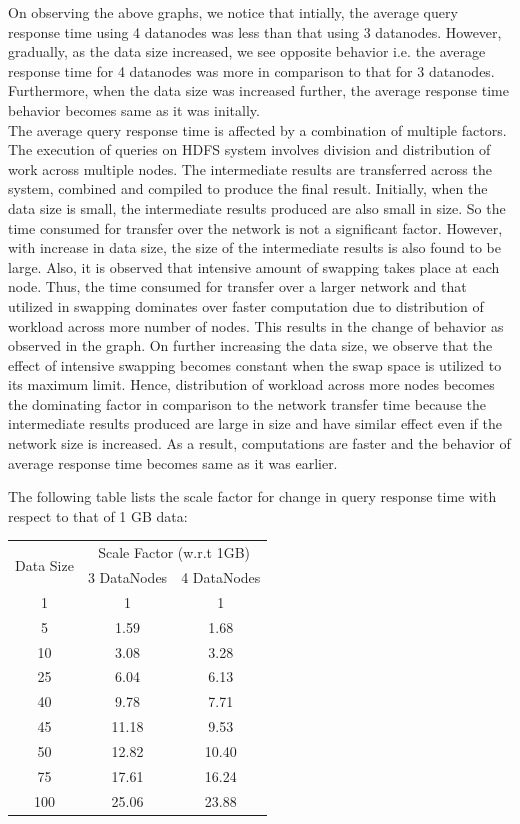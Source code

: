 \documentclass[12pt]{book}
\begin{document}
On observing the above graphs, we notice that intially, the average query response time using 4 datanodes was less than that using 3 datanodes.
However, gradually, as the data size increased, we see opposite behavior i.e. the average response time for 4 datanodes was more in comparison
to that for 3 datanodes. Furthermore, when the data size was increased further, the average response time behavior becomes same as it was 
initally.
\\\noindent
The average query response time is affected by a combination of multiple factors. The execution of queries on HDFS system involves division
and distribution of work across multiple nodes. The intermediate results are transferred across the system, combined and compiled to produce
the final result. Initially, when the data size is small, the intermediate results produced are also small in size. So the time consumed for 
transfer over the network is not a significant factor. However, with increase in data size, the size of the intermediate results is also found 
to be large. Also, it is observed that intensive amount of swapping takes place at each node. Thus, the time consumed for transfer over a larger 
network and that utilized in swapping dominates over faster computation due to distribution of workload across more number of nodes. This 
results in the change of behavior as observed in the graph. On further increasing the data size, we observe that the effect of intensive
swapping becomes constant when the swap space is utilized to its maximum limit. Hence, distribution of workload across more nodes becomes the 
dominating factor in comparison to the network transfer time because the intermediate results produced are large in size and have similar 
effect even if the network size is increased. As a result, computations are faster and the behavior of average response time becomes same as 
it was earlier.          
\newline\noindent
\newline\noindent

The  following table lists the scale factor for change in query response time with respect to that of 1 GB data:
\begin{center}
\begin{tabular}{|c|c|c|}\hline
\multirow{2}{*}{Data Size} & \multicolumn{2}{c|}{Scale Factor (w.r.t 1GB)}\\
\cline{2-3}
& 3 DataNodes & 4 DataNodes\\\hline
1 & 1 & 1\\
5 &  1.59 & 1.68\\
10 & 3.08 & 3.28\\
25 & 6.04 & 6.13\\
40 & 9.78 & 7.71\\
45 & 11.18 & 9.53\\
50 & 12.82 & 10.40\\
75 & 17.61 & 16.24\\
100 & 25.06 & 23.88\\\hline
\end{tabular}
\end{center}
\end{document}
